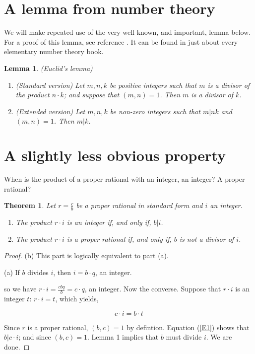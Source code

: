 \documentclass[12pt]{article}
\newtheorem{theorem}{Theorem}
\newtheorem{lemma}{Lemma}
\begin{document}
\section{A lemma from number theory}

We will make repeated use of the very well known, and important, lemma below.
For a proof of this lemma, see reference \cite{1}.  It can be found in just
about every elementary number theory book.

\begin{lemma}  (Euclid's lemma)

\begin{enumerate}
\item[(i)]  (Standard version) Let $m,n,k$ be positive integers such that $m$
  is a divisor of the product $n\cdot k$; and suppose that $(m,n)=1$.  Then $m$ is a
  divisor of $k$.

\item[(ii)]  (Extended version)  Let $m,n,k$ be non-zero integers such that
  $m|nk$ and $(m,n)=1$.  Then $m|k$.
\end{enumerate}
\end{lemma}

\section{A slightly less obvious property}

When is the product of a proper rational with an integer, an integer? A proper
rational?

\begin{theorem}  Let $r = \frac{c}{b}$ be a proper rational in standard form
  and $i$ an integer.

\begin{enumerate}
\item[(a)]  The product $r\cdot i$ is an integer if, and only if, $b|i$.

\item[(b)]  The product $r \cdot i$ is a proper rational if, and only if, $b$
  is not a divisor of $i$.
\end{enumerate}
\end{theorem}

\begin{proof} (b) This part is logically equivalent to
  part (a). 

\noindent (a)  If $b$ divides $i$, then $i = b \cdot q$, an integer.


\noindent so we have $r \cdot i = \frac{cbq}{b} = c\cdot q$, an integer.  Now
the converse.  Suppose that $r\cdot i$ is an integer $t$:  $r\cdot i = t$,
which yields,

\begin{equation}
c \cdot i = b \cdot t \label{E1}
\end{equation}

\noindent Since $r$ is a proper rational, $(b,c)=1$ by defintion.  Equation
(\ref{E1}) shows that $b|c\cdot i$; and since $(b,c) = 1$.  Lemma 1 implies
that $b$ must divide $i$.  We are done.  
\end{proof}
\end{document}

